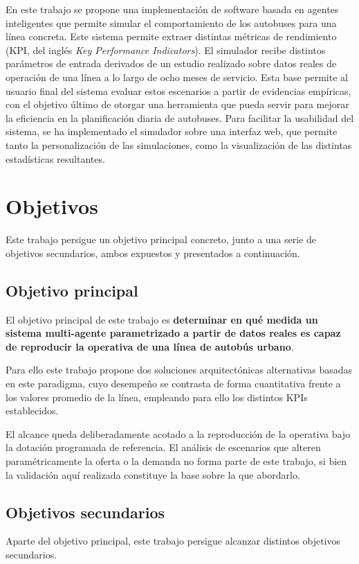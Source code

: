 En este trabajo se propone una implementación de software basada en agentes inteligentes que 
permite simular el comportamiento de los autobuses para una línea concreta. Este sistema permite 
extraer distintas métricas de rendimiento (KPI, del inglés \textit{Key Performance Indicators}). 
El simulador recibe distintos parámetros de entrada derivados de un estudio realizado sobre datos 
reales de operación de una línea a lo largo de ocho meses de servicio. Esta base permite al usuario 
final del sistema evaluar estos escenarios a partir de evidencias empíricas, con el objetivo último 
de otorgar una herramienta que pueda servir para mejorar la eficiencia en la planificación diaria 
de autobuses. Para facilitar la usabilidad del sistema, se ha implementado el simulador sobre una interfaz 
web, que permite tanto la personalización de las simulaciones, como la visualización de las distintas 
estadísticas resultantes.

\section{Objetivos}
Este trabajo persigue un objetivo principal concreto, junto a una serie de objetivos secundarios, ambos expuestos y presentados 
a continuación.

\subsection{Objetivo principal}
El objetivo principal de este trabajo es \textbf{determinar en qué medida un sistema multi-agente parametrizado a partir de datos 
reales es capaz de reproducir la operativa de una línea de autobús urbano}. 

Para ello este trabajo propone dos soluciones arquitectónicas alternativas basadas en este paradigma,
cuyo desempeño se contrasta de forma cuantitativa frente a los valores promedio de la línea, empleando para ello
los distintos KPIs establecidos.

El alcance queda deliberadamente acotado a la reproducción de la operativa bajo la dotación programada de referencia. El análisis de
escenarios que alteren paramétricamente la oferta o la demanda no forma parte de este trabajo, si bien la validación aquí realizada
constituye la base sobre la que abordarlo.

\subsection{Objetivos secundarios}
Aparte del objetivo principal, este trabajo persigue alcanzar distintos objetivos secundarios.

